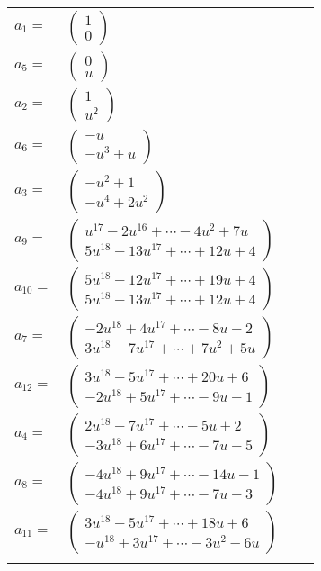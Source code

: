 \documentclass[1p]{elsarticle_modified}
\theoremstyle{definition}
\begin{document}
\begin{tabular}{m{7pt} m{180pt} m{7pt} m{180pt} }
\flushright $a_{1}=$&$\begin{pmatrix}1\\0\end{pmatrix}$ \\
\flushright $a_{5}=$&$\begin{pmatrix}0\\u\end{pmatrix}$ \\
\flushright $a_{2}=$&$\begin{pmatrix}1\\u^2\end{pmatrix}$ \\
\flushright $a_{6}=$&$\begin{pmatrix}- u\\- u^3+u\end{pmatrix}$ \\
\flushright $a_{3}=$&$\begin{pmatrix}- u^2+1\\- u^4+2 u^2\end{pmatrix}$ \\
\flushright $a_{9}=$&$\begin{pmatrix}u^{17}-2 u^{16}+\cdots-4 u^2+7 u\\5 u^{18}-13 u^{17}+\cdots+12 u+4\end{pmatrix}$ \\
\flushright $a_{10}=$&$\begin{pmatrix}5 u^{18}-12 u^{17}+\cdots+19 u+4\\5 u^{18}-13 u^{17}+\cdots+12 u+4\end{pmatrix}$ \\
\flushright $a_{7}=$&$\begin{pmatrix}-2 u^{18}+4 u^{17}+\cdots-8 u-2\\3 u^{18}-7 u^{17}+\cdots+7 u^2+5 u\end{pmatrix}$ \\
\flushright $a_{12}=$&$\begin{pmatrix}3 u^{18}-5 u^{17}+\cdots+20 u+6\\-2 u^{18}+5 u^{17}+\cdots-9 u-1\end{pmatrix}$ \\
\flushright $a_{4}=$&$\begin{pmatrix}2 u^{18}-7 u^{17}+\cdots-5 u+2\\-3 u^{18}+6 u^{17}+\cdots-7 u-5\end{pmatrix}$ \\
\flushright $a_{8}=$&$\begin{pmatrix}-4 u^{18}+9 u^{17}+\cdots-14 u-1\\-4 u^{18}+9 u^{17}+\cdots-7 u-3\end{pmatrix}$ \\
\flushright $a_{11}=$&$\begin{pmatrix}3 u^{18}-5 u^{17}+\cdots+18 u+6\\- u^{18}+3 u^{17}+\cdots-3 u^2-6 u\end{pmatrix}$\\&\end{tabular}
\end{document}
